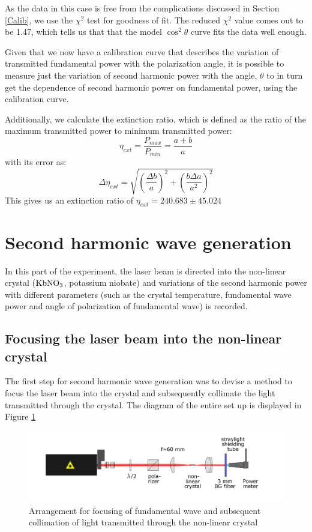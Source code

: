 As the data in this case is free from the complications discussed in Section \ref{Calib}, we use the $\chi^{2}$ test for goodness of fit. The reduced $\chi^{2}$ value comes out to be 1.47, which tells us that that the model $\cos^{2}\theta$ curve fits the data well enough. 

Given that we now have a calibration curve that describes the variation of transmitted fundamental power with the polarization angle, it is possible to measure just the variation of second harmonic power with the angle, $\theta$ to in turn get the dependence of second harmonic power on fundamental power, using the calibration curve. \label{variablecalib}

Additionally, we calculate the extinction ratio, which is defined as the ratio of the maximum transmitted power to minimum transmitted power:
\begin{equation}
\eta_{ext}=\dfrac{P_{max}}{P_{min}}=\dfrac{a+b}{a}
\end{equation}
with its error as:
\begin{equation}
\Delta \eta_{ext}=\sqrt{\left(\dfrac{\Delta b}{a}\right)^{2}+\left(\dfrac{b\Delta a}{a^{2}}\right)^{2}}
\end{equation}
This gives us an extinction ratio of $\eta_{ext}=240.683\pm 45.024$

\section{Second harmonic wave generation}
In this part of the experiment, the laser beam is directed into the non-linear crystal ($\rm{KbNO_{3}}$, potassium niobate) and variations of the second harmonic power with different parameters (such as the crystal temperature, fundamental wave power and angle of polarization of fundamental wave) is recorded.

\subsection{Focusing the laser beam into the non-linear crystal}
The first step for second harmonic wave generation was to devise a method to focus the laser beam into the crystal and subsequently collimate the light transmitted through the crystal. The diagram of the entire set up is displayed in Figure \ref{figexpt6}

\begin{figure}[H]
\includegraphics[scale=0.4]{./imagesandplots/pic3.png}
\centering
\caption{Arrangement for focusing of fundamental wave and subsequent collimation of light transmitted through the non-linear crystal \cite{UB}}
\label{figexpt6}
\end{figure}

